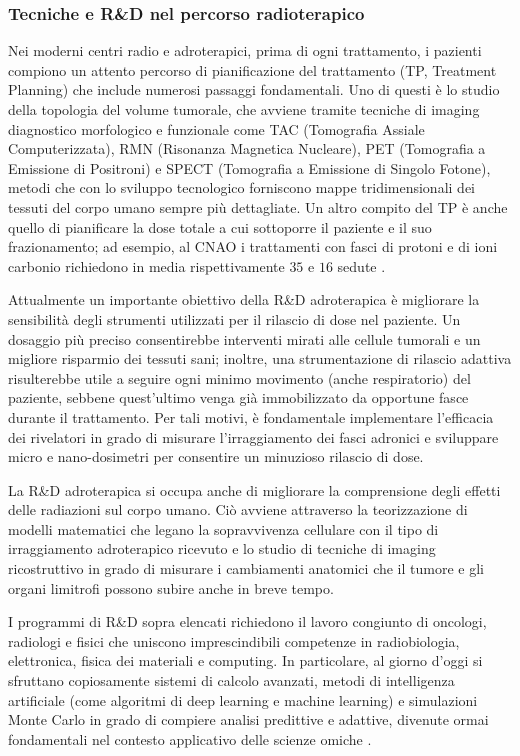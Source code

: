 \documentclass[12pt,a4paper,twoside]{report}
\begin{document}
	\subsubsection{Tecniche e R\&D nel percorso radioterapico}
	Nei moderni centri radio e adroterapici, prima di ogni trattamento, i pazienti compiono un attento percorso di pianificazione del trattamento (TP, Treatment Planning) che include numerosi passaggi fondamentali. Uno di questi è lo studio della topologia del volume tumorale, che avviene tramite tecniche di imaging diagnostico morfologico e funzionale come TAC (Tomografia Assiale Computerizzata), RMN (Risonanza Magnetica Nucleare), PET (Tomografia a Emissione di Positroni) e SPECT (Tomografia a Emissione di Singolo Fotone), metodi che con lo sviluppo tecnologico forniscono mappe tridimensionali dei tessuti del corpo umano sempre più dettagliate. Un altro compito del TP è anche quello di pianificare la dose totale a cui sottoporre il paziente e il suo frazionamento; ad esempio, al CNAO i trattamenti con fasci di protoni e di ioni carbonio richiedono in media rispettivamente $35$ e $16$ sedute \cite{cnao7}.
	
	Attualmente un importante obiettivo della R\&D adroterapica è migliorare la sensibilità degli strumenti utilizzati per il rilascio di dose nel paziente. Un dosaggio più preciso consentirebbe interventi mirati alle cellule tumorali e un migliore risparmio dei tessuti sani; inoltre, una strumentazione di rilascio adattiva risulterebbe utile a seguire ogni minimo movimento (anche respiratorio) del paziente, sebbene quest'ultimo venga già immobilizzato da opportune fasce durante il trattamento. Per tali motivi, è fondamentale implementare l'efficacia dei rivelatori in grado di misurare l'irraggiamento dei fasci adronici e sviluppare micro e nano-dosimetri per consentire un minuzioso rilascio di dose.
	
	La R\&D adroterapica si occupa anche di migliorare la comprensione degli effetti delle radiazioni sul corpo umano. Ciò avviene attraverso la teorizzazione di modelli matematici che legano la sopravvivenza cellulare con il tipo di irraggiamento adroterapico ricevuto e lo studio di tecniche di imaging ricostruttivo in grado di misurare i cambiamenti anatomici che il tumore e gli organi limitrofi possono subire anche in breve tempo.
	
	I programmi di R\&D sopra elencati richiedono il lavoro congiunto di oncologi, radiologi e fisici che uniscono imprescindibili competenze in radiobiologia, elettronica, fisica dei materiali e computing. In particolare, al giorno d'oggi si sfruttano copiosamente sistemi di calcolo avanzati, metodi di intelligenza artificiale (come algoritmi di deep learning e machine learning) e simulazioni Monte Carlo in grado di compiere analisi predittive e adattive, divenute ormai fondamentali nel contesto applicativo delle scienze omiche \cite{asimmetrie_curareCLP,asimmetrie_DLAS,asimmetrie_curareGD}.
	
\end{document}
